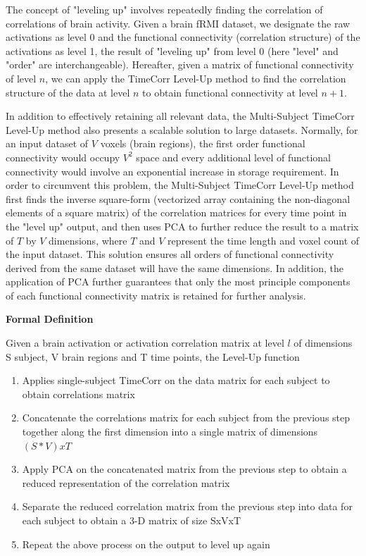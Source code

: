 \documentclass[11pt]{article}
\begin{document}
The concept of "leveling up" involves repeatedly finding the correlation of correlations of brain activity. Given a brain fRMI dataset, we designate the raw activations as level 0 and the functional connectivity (correlation structure) of the activations as level 1, the result of "leveling up" from level 0 (here "level" and "order" are interchangeable). Hereafter, given a matrix of functional connectivity of level $n$, we can apply the TimeCorr Level-Up method to find the correlation structure of the data at level $n$ to obtain functional connectivity at level $n+1$.

In addition to effectively retaining all relevant data, the Multi-Subject TimeCorr Level-Up method also presents a scalable solution to large datasets. Normally, for an input dataset of $V$ voxels (brain regions), the first order functional connectivity would occupy $V^2$ space and every additional level of functional connectivity would involve an exponential increase in storage requirement. In order to circumvent this problem, the Multi-Subject TimeCorr Level-Up method first finds the inverse square-form (vectorized array containing the non-diagonal elements of a square matrix) of the correlation matrices for every time point in the "level up" output, and then uses PCA to further reduce the result to a matrix of $T$ by $V$ dimensions, where $T$ and $V$ represent the time length and voxel count of the input dataset. This solution ensures all orders of functional connectivity derived from the same dataset will have the same dimensions. In addition, the application of PCA further guarantees that only the most principle components of each functional connectivity matrix is retained for further analysis.

\large{\textbf{Formal Definition}}

\normalsize
Given a brain activation or activation correlation matrix at level $l$ of dimensions S subject, V brain regions and T time points, the Level-Up function

\begin{enumerate}
\item Applies single-subject TimeCorr on the data matrix for each subject to obtain correlations matrix

\item Concatenate the correlations matrix for each subject from the previous step together along the first dimension into a single matrix of dimensions $(S*V)xT$

\item Apply PCA on the concatenated matrix from the previous step to obtain a reduced representation of the correlation matrix

\item Separate the reduced correlation matrix from the previous step into data for each subject to obtain a 3-D matrix of size SxVxT

\item Repeat the above process on the output to level up again

\end{enumerate}
\end{document}

